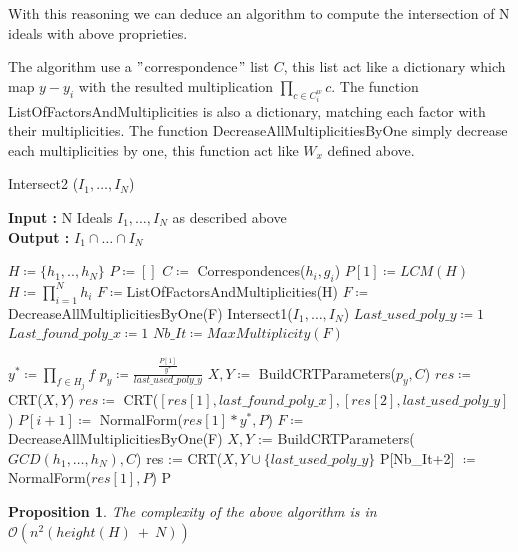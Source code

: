 \documentclass{article}
\newtheorem{proposition}{Proposition}[section]
\begin{document}
\begin{flushleft}
With this reasoning we can deduce an algorithm to compute the intersection of N ideals with above proprieties.

The algorithm use a \("\)correspondence\("\) list $C$, this list act like a dictionary which map $y-y_{i}$ with the resulted multiplication $\prod_{c \in C_{i}^{w} } c$.\newline
The function ListOfFactorsAndMultiplicities is also a dictionary, matching each factor with their multiplicities.\newline
The function DecreaseAllMultiplicitiesByOne simply decrease each multiplicities by one, this function act like $W_{x}$ defined above.\newline

\begin{algorithm}[H]
    \caption{Intersect2 ($I_{1},\dots,I_{N}$)}\label{alg:intersect-2-ideals-diff-gcd}
    \textbf{Input : } N Ideals $I_{1},\dots,I_{N}$ as described above \\
    \textbf{Output : }$I_{1} \cap \dots\cap I_ {N}$
\begin{algorithmic}
    \State $H \coloneqq \{h_{1},..,h_{N}\}$
    \State $P \coloneqq []$
    \State $C \coloneqq $ Correspondences($h_{i},g_{i}$) 
    \State $P[1] \coloneqq LCM(H)$
    \State $H \coloneqq \prod^{N}_{i=1} h_{i}$
    \State $F \coloneqq $ListOfFactorsAndMultiplicities(H)
    \State $F \coloneqq $DecreaseAllMultiplicitiesByOne(F)
        \State \Return Intersect1($I_{1},\dots,I_{N}$)
    \EndIf
    \State $Last\_used\_poly\_y \coloneqq 1$
    \State $Last\_found\_poly\_x \coloneqq 1$
    \State $Nb\_It \coloneqq MaxMultiplicity(F) $ 

        \State $y^{*}\coloneqq \prod_{f \in H_{j}} f$ 
        \State $p_y\coloneqq \frac{\frac{P[1]}{y^{*}}}{last\_used\_poly\_y}$ 
        \State $X, Y\coloneqq$ BuildCRTParameters($p_y, C$)
        \State $res \coloneqq $ CRT($X,Y$)
            \State $res \coloneqq $ CRT($[res[1],last\_found\_poly\_x],[res[2],last\_used\_poly\_y]$)
        \EndIf
        \State $P[i+1] \coloneqq $ NormalForm($res[1]*y^{*},P$)
        \State $F \coloneqq $ DecreaseAllMultiplicitiesByOne(F)
    \EndFor
    \State $X,Y$ := BuildCRTParameters($GCD(h_{1},\dots,h_{N}),C$)
    \State res := CRT($X,Y\cup\{last\_used\_poly\_y\}$
    \State P[Nb\_It+2] $\coloneqq $NormalForm($res[1],P$)
    \State \Return P

\end{algorithmic}
\end{algorithm}

\begin{proposition} 
    The complexity of the above algorithm is in $\mathcal{O}(n^{2}(height(H)\ +\ N))$
\end{proposition}

\end{flushleft}
\end{document}
